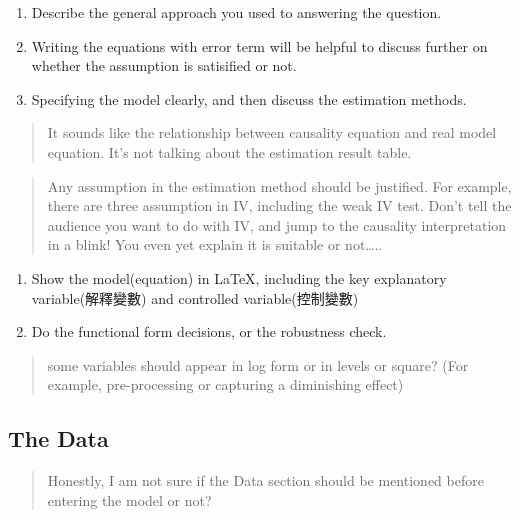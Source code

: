 \documentclass[]{book}
\begin{document}
\begin{enumerate}
\def\labelenumi{\arabic{enumi}.}
\item
  Describe the general approach you used to answering the question.
\item
  Writing the equations with error term will be helpful to discuss further on whether the assumption is satisified or not.
\item
  Specifying the model clearly, and then discuss the estimation methods.
\end{enumerate}

\begin{quote}
It sounds like the relationship between causality equation and real model equation. It's not talking about the estimation result table.
\end{quote}

\begin{quote}
Any assumption in the estimation method should be justified. For example, there are three assumption in IV, including the weak IV test. Don't tell the audience you want to do with IV, and jump to the causality interpretation in a blink! You even yet explain it is suitable or not\ldots{}..
\end{quote}

\begin{enumerate}
\def\labelenumi{\arabic{enumi}.}
\setcounter{enumi}{3}
\item
  Show the model(equation) in LaTeX, including the key explanatory variable(解釋變數) and controlled variable(控制變數)
\item
  Do the functional form decisions, or the robustness check.
\end{enumerate}

\begin{quote}
some variables should appear in log form or in levels or square? (For example, pre-processing or capturing a diminishing effect)
\end{quote}

\hypertarget{the-data}{%
\subsection{The Data}\label{the-data}}

\begin{quote}
Honestly, I am not sure if the Data section should be mentioned before entering the model or not?
\end{quote}
\end{document}
